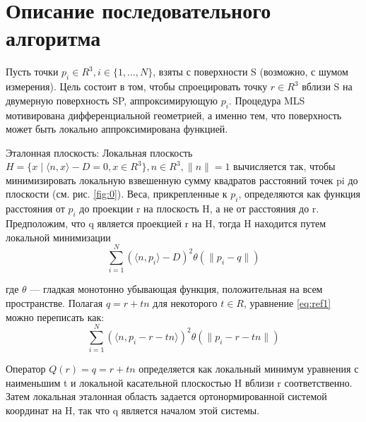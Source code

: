 

\section{Описание последовательного алгоритма}

Пусть точки $p_i \in R^{3}, i \in \{1, . . . , N\}$, взяты с
поверхности S (возможно, с шумом измерения). Цель состоит в том, чтобы спроецировать точку $r \in R^{3}$ вблизи S на двумерную поверхность SP, аппроксимирующую $p_i$. Процедура MLS мотивирована дифференциальной геометрией, а именно тем, что поверхность может быть локально аппроксимирована функцией.

Эталонная плоскость: 
 Локальная плоскость $ H = \{x \mid \langle n, x \rangle - D = 0, x  \in R^{3}\}, n \in R^{3},  \parallel n \parallel = 1 $ вычисляется так, чтобы минимизировать локальную взвешенную сумму квадратов расстояний точек pi до плоскости (см. рис. \ref{fig:0}). Веса, прикрепленные к $p_i$, определяются как функция расстояния от $p_i$ до проекции r на плоскость H, а не от расстояния до r. Предположим, что q является проекцией r на H, тогда H находится путем локальной минимизации
 \begin{equation}
     \sum_{i = 1}^{N}(\langle n, p_i \rangle - D)^{2} \theta(\parallel p_i - q \parallel)
     \label{eq:ref1}
 \end{equation}

где $\theta$ — гладкая монотонно убывающая функция, положительная на всем пространстве. Полагая $q = r + tn$ для некоторого $t \in R$, уравнение \ref{eq:ref1} можно переписать как: 
 $$\sum_{i = 1}^{N}(\langle n, p_i - r - tn \rangle)^{2} \theta(\parallel p_i - r - tn \parallel)$$
 
  Оператор $Q(r) = q = r + tn$ определяется как локальный минимум уравнения  с наименьшим t и локальной касательной плоскостью H вблизи r соответственно. Затем локальная эталонная область задается ортонормированной системой координат на H, так что q является началом этой системы.

